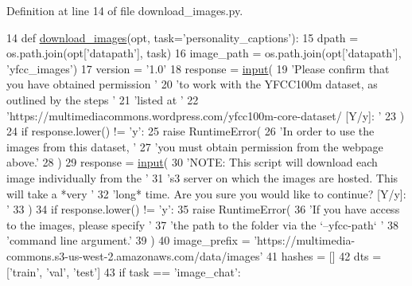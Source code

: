 Definition at line 14 of file download\+\_\+images.\+py.


\begin{DoxyCode}
14 \textcolor{keyword}{def }\hyperlink{namespaceparlai_1_1tasks_1_1personality__captions_1_1download__images_a9d812a095ca6d48541b3d5cdc65a4bf3}{download\_images}(opt, task='personality\_captions'):
15     dpath = os.path.join(opt[\textcolor{stringliteral}{'datapath'}], task)
16     image\_path = os.path.join(opt[\textcolor{stringliteral}{'datapath'}], \textcolor{stringliteral}{'yfcc\_images'})
17     version = \textcolor{stringliteral}{'1.0'}
18     response = \hyperlink{namespaceparlai_1_1mturk_1_1core_1_1dev_1_1test_1_1test__full__system_a1e1817cd65688fb90f827834d1fb4567}{input}(
19         \textcolor{stringliteral}{'Please confirm that you have obtained permission '}
20         \textcolor{stringliteral}{'to work with the YFCC100m dataset, as outlined by the steps '}
21         \textcolor{stringliteral}{'listed at '}
22         \textcolor{stringliteral}{'https://multimediacommons.wordpress.com/yfcc100m-core-dataset/ [Y/y]: '}
23     )
24     \textcolor{keywordflow}{if} response.lower() != \textcolor{stringliteral}{'y'}:
25         \textcolor{keywordflow}{raise} RuntimeError(
26             \textcolor{stringliteral}{'In order to use the images from this dataset, '}
27             \textcolor{stringliteral}{'you must obtain permission from the webpage above.'}
28         )
29     response = \hyperlink{namespaceparlai_1_1mturk_1_1core_1_1dev_1_1test_1_1test__full__system_a1e1817cd65688fb90f827834d1fb4567}{input}(
30         \textcolor{stringliteral}{'NOTE: This script will download each image individually from the '}
31         \textcolor{stringliteral}{'s3 server on which the images are hosted. This will take a *very '}
32         \textcolor{stringliteral}{'long* time. Are you sure you would like to continue? [Y/y]: '}
33     )
34     \textcolor{keywordflow}{if} response.lower() != \textcolor{stringliteral}{'y'}:
35         \textcolor{keywordflow}{raise} RuntimeError(
36             \textcolor{stringliteral}{'If you have access to the images, please specify '}
37             \textcolor{stringliteral}{'the path to the folder via the `--yfcc-path` '}
38             \textcolor{stringliteral}{'command line argument.'}
39         )
40     image\_prefix = \textcolor{stringliteral}{'https://multimedia-commons.s3-us-west-2.amazonaws.com/data/images'}
41     hashes = []
42     dts = [\textcolor{stringliteral}{'train'}, \textcolor{stringliteral}{'val'}, \textcolor{stringliteral}{'test'}]
43     \textcolor{keywordflow}{if} task == \textcolor{stringliteral}{'image\_chat'}:

\end{DoxyCode}
